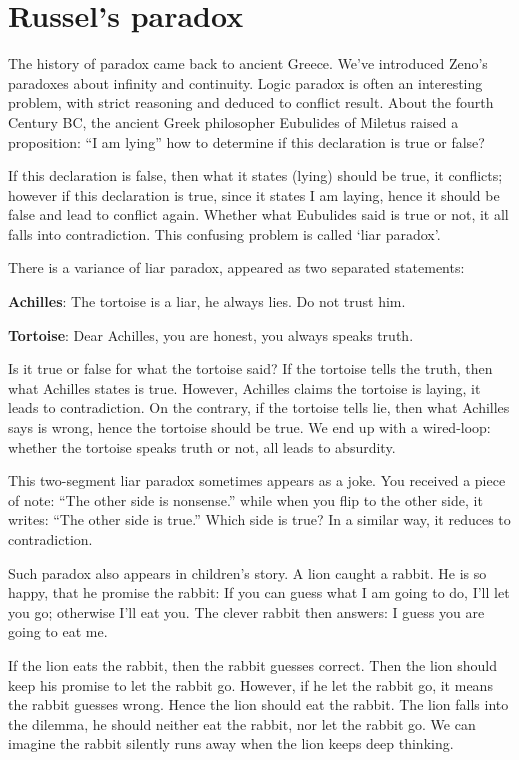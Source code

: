 \documentclass{article}
\begin{document}
\section{Russel's paradox}

The history of paradox came back to ancient Greece. We've introduced Zeno's paradoxes about infinity and continuity. Logic paradox is often an interesting problem, with strict reasoning and deduced to conflict result. About the fourth Century BC, the ancient Greek philosopher Eubulides of Miletus raised a proposition: ``I am lying'' how to determine if this declaration is true or false?

If this declaration is false, then what it states (lying) should be true, it conflicts; however if this declaration is true, since it states I am laying, hence it should be false and lead to conflict again. Whether what Eubulides said is true or not, it all falls into contradiction. This confusing problem is called `liar paradox'.

There is a variance of liar paradox, appeared as two separated statements:

\textbf{Achilles}: The tortoise is a liar, he always lies. Do not trust him.

\textbf{Tortoise}: Dear Achilles, you are honest, you always speaks truth.

Is it true or false for what the tortoise said? If the tortoise tells the truth, then what Achilles states is true. However, Achilles claims the tortoise is laying, it leads to contradiction. On the contrary, if the tortoise tells lie, then what Achilles says is wrong, hence the tortoise should be true. We end up with a wired-loop: whether the tortoise speaks truth or not, all leads to absurdity.

This two-segment liar paradox sometimes appears as a joke. You received a piece of note: ``The other side is nonsense.'' while when you flip to the other side, it writes: ``The other side is true.'' Which side is true? In a similar way, it reduces to contradiction.

Such paradox also appears in children's story. A lion caught a rabbit. He is so happy, that he promise the rabbit: If you can guess what I am going to do, I'll let you go; otherwise I'll eat you. The clever rabbit then answers: I guess you are going to eat me.

If the lion eats the rabbit, then the rabbit guesses correct. Then the lion should keep his promise to let the rabbit go. However, if he let the rabbit go, it means the rabbit guesses wrong. Hence the lion should eat the rabbit. The lion falls into the dilemma, he should neither eat the rabbit, nor let the rabbit go. We can imagine the rabbit silently runs away when the lion keeps deep thinking.
\end{document}
